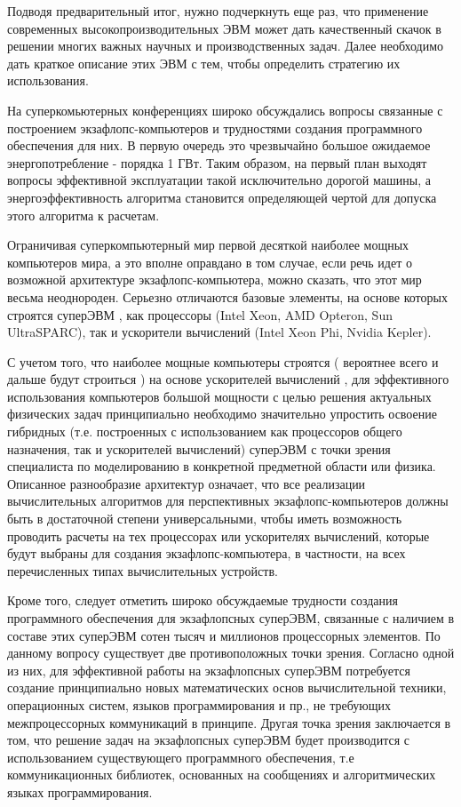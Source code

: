 Подводя предварительный итог, нужно подчеркнуть еще раз, что применение современных высокопроизводительных ЭВМ может дать качественный скачок в решении многих важных научных и производственных задач. Далее необходимо дать краткое описание этих ЭВМ с тем, чтобы определить стратегию их использования. 

На суперкомьютерных конференциях \cite{Abrau2011} широко обсуждались вопросы связанные с построением экзафлопс-компьютеров и трудностями создания программного обеспечения для них. 
В первую очередь это чрезвычайно большое ожидаемое энергопотребление - порядка 1 ГВт. Таким образом, на первый план выходят вопросы эффективной эксплуатации такой исключительно дорогой машины, а энергоэффективность алгоритма становится определяющей чертой для допуска этого алгоритма к расчетам.

Ограничивая суперкомпьютерный мир первой десяткой наиболее мощных компьютеров мира, а это вполне оправдано в том случае, если речь идет о возможной архитектуре экзафлопс-компьютера,  можно сказать, что этот мир весьма неоднороден. Серьезно отличаются базовые элементы, на основе которых строятся суперЭВМ , как процессоры (Intel Xeon, AMD Opteron, Sun UltraSPARC), так и ускорители вычислений (Intel Xeon Phi, Nvidia Kepler). 

С учетом того, что наиболее мощные компьютеры строятся ( вероятнее всего и дальше будут строиться \cite{Lu2015}) на основе ускорителей вычислений \cite{Stepanenko2010}, для эффективного использования компьютеров большой мощности с целью решения актуальных физических задач принципиально необходимо значительно упростить освоение гибридных (т.е. построенных с использованием как процессоров общего назначения, так и ускорителей вычислений) суперЭВМ с точки зрения специалиста по моделированию в конкретной предметной области или физика. 
Описанное разнообразие архитектур означает, что все реализации вычислительных алгоритмов для перспективных экзафлопс-компьютеров должны быть в достаточной степени универсальными, чтобы иметь возможность проводить расчеты на тех процессорах или ускорителях вычислений, которые будут  выбраны для создания экзафлопс-компьютера, в частности, на всех перечисленных типах вычислительных устройств. 


Кроме того, следует отметить широко обсуждаемые трудности создания программного обеспечения для экзафлопсных суперЭВМ, связанные с наличием в составе этих суперЭВМ сотен тысяч и миллионов процессорных элементов. По данному вопросу существует две противоположных точки зрения. 
Согласно одной из них, для эффективной работы на экзафлопсных суперЭВМ потребуется создание принципиально новых математических основ вычислительной техники, операционных систем, языков программирования и пр., не требующих межпроцессорных коммуникаций в принципе. Другая точка зрения заключается в том, что решение задач на экзафлопсных суперЭВМ будет производится с использованием существующего программного обеспечения, т.е коммуникационных библиотек, основанных на сообщениях \cite{Gropp2009} и алгоритмических языках программирования. 

